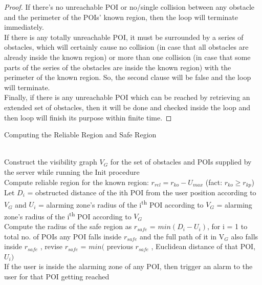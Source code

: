 \documentclass{sig-alternate}
\begin{document}
\begin{proof}
If there's no unreachable POI or no/single collision between any obstacle and the perimeter of the POIs' known region, then the loop will terminate immediately.
\\If there is any totally unreachable POI, it must be surrounded by a series of obstacles, which will certainly cause no collision (in case that all obstacles are already inside the known region) or more than one collision (in case that some parts of the series of the obstacles are inside the known region) with the perimeter of the known region. So, the second clause will be false and the loop will terminate.
\\Finally, if there is any unreachable POI which can be reached by retrieving an extended set of obstacles, then it will be done and checked inside the loop and then loop will finish its purpose within finite time.
\end{proof}

\begin{algorithm}
\caption{Computing the Reliable Region and Safe Region}
\label{CRRSR}
\begin{algorithmic}[1]
\\Construct the visibility graph $V_G$ for the set of obstacles and POIs supplied by the server while running the Init procedure
\\Compute reliable region for the known region: $r_{rel} = r_{ko} - U_{max}$ (fact: $r_{ko} \geqslant r_{kp}$)
\\Let $D_i$ = obstructed distance of the ith POI from the user position according to $V_G$
and $U_i$ = alarming zone's radius of the i\textsuperscript{th} POI according to $V_G$ = alarming zone's radius of the i\textsuperscript{th} POI according to $V_G$
\\Compute the radius of the safe region as $r_{safe}$  = $min ( D_i  - U_i )$, for i = 1 to total no. of POIs
\While any POI falls inside $r_{safe}$ and the full path of it in V$_G$ also falls inside $r_{safe}$ , 
\State revise $r_{safe}$ = $min ($ previous $r_{safe}$ , Euclidean distance of that POI, $U_i )$
\EndWhile
\\If the user is inside the alarming zone of any POI, then trigger an alarm to the user for that POI getting reached

\EndProcedure
\end{algorithmic}
\end{algorithm}
\end{document}
